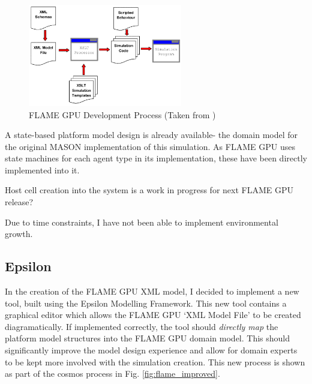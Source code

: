 \documentclass{UoYCSproject}
\begin{document}
\begin{figure}[htp]
\centering
\includegraphics[width=0.6\textwidth]{Appendix/FLAME_Process}
\caption{\gls{FLAME GPU} Development Process (Taken from \cite{flame_simulation})}
\label{fig:flame_dev}
\end{figure}

A state-based platform model design is already available- the domain model for the original \gls{MASON} implementation of this simulation.
As \gls{FLAME GPU} uses state machines for each agent type in its implementation, these have been directly implemented into it.

Host cell creation into the system is a work in progress for next \gls{FLAME GPU} release?

Due to time constraints, I have not been able to implement environmental growth.

\subsection{Epsilon}
In the creation of the \gls{FLAME GPU} XML model, I decided to implement a new tool, built using the Epsilon Modelling Framework.
This new tool contains a graphical editor which allows the \gls{FLAME GPU} `XML Model File' to be created diagramatically.
If implemented correctly, the tool should \textit{directly map} the platform model structures into the \gls{FLAME GPU} domain model.
This should significantly improve the model design experience and allow for domain experts to be kept more involved with the simulation creation.
This new process is shown as part of the \gls{cosmos} process in Fig. \ref{fig:flame_improved}.
\end{document}

